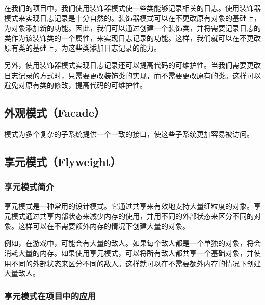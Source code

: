 \documentclass[cn,black,12pt,normal]{elegantnote}
\begin{document}
在我们的项目中，我们使用装饰器模式使一些类能够记录相关的日志。使用装饰器模式来实现日志记录是十分自然的。装饰器模式可以在不更改原有对象的基础上，为对象添加新的功能。因此，我们可以通过创建一个装饰类，并将需要记录日志的类作为该装饰类的一个属性，来实现日志记录的功能。这样，我们就可以在不更改原有类的基础上，为这些类添加日志记录的能力。

另外，使用装饰器模式实现日志记录还可以提高代码的可维护性。当我们需要更改日志记录的方式时，只需要更改装饰类的实现，而不需要更改原有的类。这样可以避免对原有类的修改，提高代码的可维护性。

\subsection{外观模式（Facade）}

模式为多个复杂的子系统提供一个一致的接口，使这些子系统更加容易被访问。

\subsection{享元模式（Flyweight）}

\subsubsection{享元模式简介}

享元模式是一种常用的设计模式。它通过共享来有效地支持大量细粒度的对象。享元模式通过共享内部状态来减少内存的使用，并用不同的外部状态来区分不同的对象。这样可以在不需要额外内存的情况下创建大量的对象。

例如，在游戏中，可能会有大量的敌人。如果每个敌人都是一个单独的对象，将会消耗大量的内存。如果使用享元模式，可以将所有敌人都共享一个基础对象，并使用不同的外部状态来区分不同的敌人。这样就可以在不需要额外内存的情况下创建大量敌人。

\subsubsection{享元模式在项目中的应用}
\end{document}
